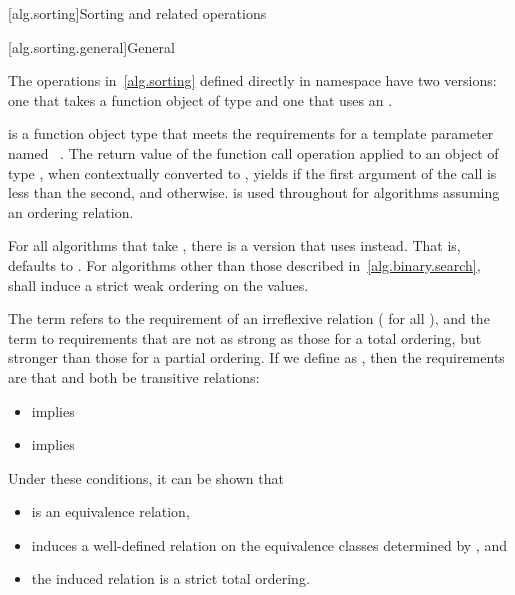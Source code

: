 [alg.sorting]{Sorting and related operations}

[alg.sorting.general]{General}

\pnum
The operations in~\ref{alg.sorting} defined directly in namespace 
have two versions:
one that takes a function object of type  and
one that uses an .

\pnum
{} is a function object type
that meets the requirements for a template parameter
named ~.
The return value of the function call operation
applied to an object of type ,
when contextually converted to ,
yields 
if the first argument of the call is less than the second, and
 otherwise.
 is used throughout
for algorithms assuming an ordering relation.

\pnum
For all algorithms that take ,
there is a version that uses  instead.
That is,  defaults to .
For algorithms other than those described in~\ref{alg.binary.search},
 shall induce a strict weak ordering on the values.

\pnum
The term  refers to the requirement
of an irreflexive relation ( for all ),
and the term  to requirements
that are not as strong as those for a total ordering,
but stronger than those for a partial ordering.
If we define  as ,
then the requirements are that  and 
both be transitive relations:

\begin{itemize}
\item {} implies 
\item {} implies 
\end{itemize}
\begin{note}
Under these conditions, it can be shown that
\begin{itemize}
\item
   is an equivalence relation,
\item
   induces a well-defined relation
  on the equivalence classes determined by , and
\item
  the induced relation is a strict total ordering.
\end{itemize}
\end{note}

